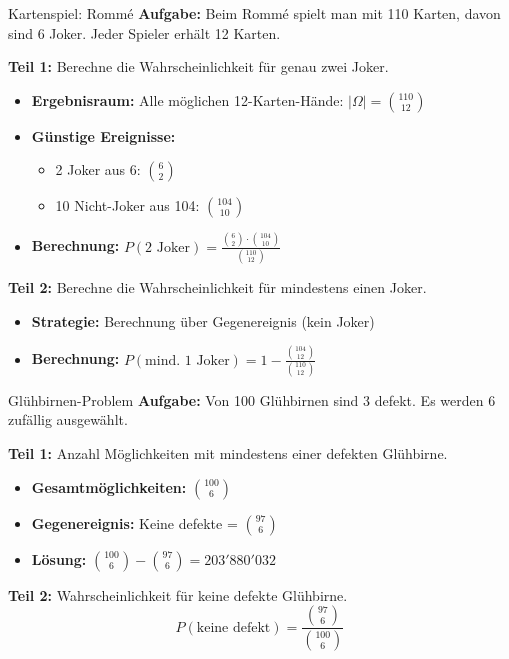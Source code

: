 \begin{example}{Kartenspiel: Rommé}
\textbf{Aufgabe:} Beim Rommé spielt man mit 110 Karten, davon sind 6 Joker. Jeder Spieler erhält 12 Karten.

\textbf{Teil 1:} Berechne die Wahrscheinlichkeit für genau zwei Joker.
\begin{itemize}
\item \textbf{Ergebnisraum:} Alle möglichen 12-Karten-Hände: $|\Omega| = \binom{110}{12}$
\item \textbf{Günstige Ereignisse:}
    \begin{itemize}
    \item 2 Joker aus 6: $\binom{6}{2}$
    \item 10 Nicht-Joker aus 104: $\binom{104}{10}$
    \end{itemize}
\item \textbf{Berechnung:} $P(\text{2 Joker}) = \frac{\binom{6}{2} \cdot \binom{104}{10}}{\binom{110}{12}}$
\end{itemize}

\textbf{Teil 2:} Berechne die Wahrscheinlichkeit für mindestens einen Joker.
\begin{itemize}
\item \textbf{Strategie:} Berechnung über Gegenereignis (kein Joker)
\item \textbf{Berechnung:} $P(\text{mind. 1 Joker}) = 1 - \frac{\binom{104}{12}}{\binom{110}{12}}$
\end{itemize}
\end{example}

\begin{example}{Glühbirnen-Problem}
\textbf{Aufgabe:} Von 100 Glühbirnen sind 3 defekt. Es werden 6 zufällig ausgewählt.

\textbf{Teil 1:} Anzahl Möglichkeiten mit mindestens einer defekten Glühbirne.
\begin{itemize}
\item \textbf{Gesamtmöglichkeiten:} $\binom{100}{6}$
\item \textbf{Gegenereignis:} Keine defekte = $\binom{97}{6}$
\item \textbf{Lösung:} $\binom{100}{6} - \binom{97}{6} = 203'880'032$
\end{itemize}

\textbf{Teil 2:} Wahrscheinlichkeit für keine defekte Glühbirne.
$$P(\text{keine defekt}) = \frac{\binom{97}{6}}{\binom{100}{6}}$$
\end{example}

